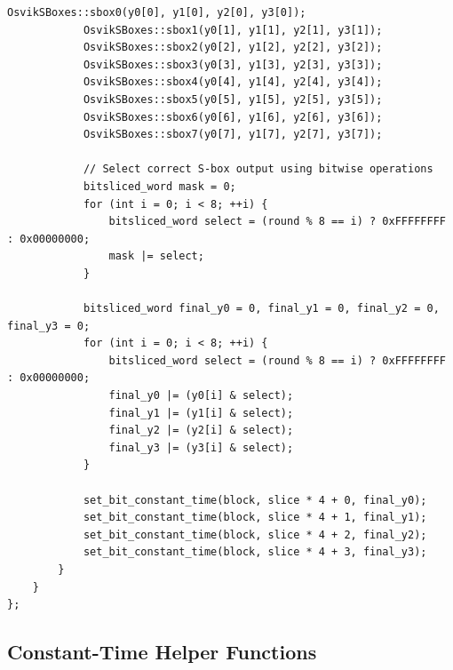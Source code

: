 \documentclass[12pt,a4paper]{article}
\begin{document}
\begin{lstlisting}[caption=Constant-Time Bitsliced Serpent Cipher]
            OsvikSBoxes::sbox0(y0[0], y1[0], y2[0], y3[0]);
            OsvikSBoxes::sbox1(y0[1], y1[1], y2[1], y3[1]);
            OsvikSBoxes::sbox2(y0[2], y1[2], y2[2], y3[2]);
            OsvikSBoxes::sbox3(y0[3], y1[3], y2[3], y3[3]);
            OsvikSBoxes::sbox4(y0[4], y1[4], y2[4], y3[4]);
            OsvikSBoxes::sbox5(y0[5], y1[5], y2[5], y3[5]);
            OsvikSBoxes::sbox6(y0[6], y1[6], y2[6], y3[6]);
            OsvikSBoxes::sbox7(y0[7], y1[7], y2[7], y3[7]);
            
            // Select correct S-box output using bitwise operations
            bitsliced_word mask = 0;
            for (int i = 0; i < 8; ++i) {
                bitsliced_word select = (round % 8 == i) ? 0xFFFFFFFF : 0x00000000;
                mask |= select;
            }
            
            bitsliced_word final_y0 = 0, final_y1 = 0, final_y2 = 0, final_y3 = 0;
            for (int i = 0; i < 8; ++i) {
                bitsliced_word select = (round % 8 == i) ? 0xFFFFFFFF : 0x00000000;
                final_y0 |= (y0[i] & select);
                final_y1 |= (y1[i] & select);
                final_y2 |= (y2[i] & select);
                final_y3 |= (y3[i] & select);
            }
            
            set_bit_constant_time(block, slice * 4 + 0, final_y0);
            set_bit_constant_time(block, slice * 4 + 1, final_y1);
            set_bit_constant_time(block, slice * 4 + 2, final_y2);
            set_bit_constant_time(block, slice * 4 + 3, final_y3);
        }
    }
};
\end{lstlisting}

\subsection{Constant-Time Helper Functions}
\end{document}
